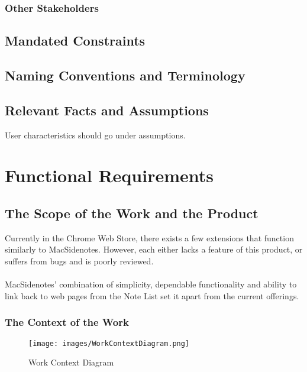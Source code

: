 \documentclass[12pt, titlepage]{article}
\begin{document}
\subsubsection{Other Stakeholders}

\subsection{Mandated Constraints}

\subsection{Naming Conventions and Terminology}

\subsection{Relevant Facts and Assumptions}

User characteristics should go under assumptions.

\section{Functional Requirements}

\subsection{The Scope of the Work and the Product}

Currently in the Chrome Web Store, there exists a few extensions that function 
similarly to MacSidenotes. However, each either lacks a feature of this 
product, or suffers from bugs and is poorly reviewed.\\
\\
MacSidenotes' combination of simplicity, dependable functionality and ability 
to link back to web pages from the Note List set it apart from the current 
offerings.

\subsubsection{The Context of the Work}

\begin{figure}[H]
	\centering
	\texttt{[image: images/WorkContextDiagram.png]}
	\caption{Work Context Diagram}
\end{figure}
\end{document}
